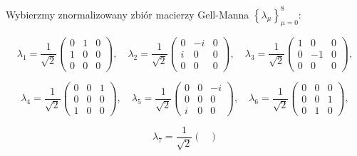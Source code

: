 {Wybierzmy znormalizowany zbiór macierzy Gell-Manna
$\left \{ \lambda_{\mu} \right \}_{\mu=0}^{8}$:
\begin{linenomath*}
 \begin{equation}
\nonumber
    \lambda_{1} = \frac{1}{\sqrt{2}} \begin{pmatrix}
            0 & 1 & 0 \\
            1 & 0 & 0 \\
            0 & 0 & 0
        \end{pmatrix}, \quad
    \lambda_{2} = \frac{1}{\sqrt{2}} \begin{pmatrix}
            0 & -i & 0 \\
            i & 0 & 0 \\
            0 & 0 & 0
        \end{pmatrix}, \quad
    \lambda_{3} = \frac{1}{\sqrt{2}} \begin{pmatrix}
            1 & 0 & 0 \\
            0 & -1 & 0 \\
            0 & 0 & 0
        \end{pmatrix},
 \end{equation}
\end{linenomath*}
\begin{linenomath*}
 \begin{equation}
\nonumber
    \lambda_{4} = \frac{1}{\sqrt{2}} \begin{pmatrix}
            0 & 0 & 1 \\
            0 & 0 & 0 \\
            1 & 0 & 0
        \end{pmatrix}, \quad
    \lambda_{5} = \frac{1}{\sqrt{2}} \begin{pmatrix}
            0 & 0 & -i \\
            0 & 0 & 0 \\
            i & 0 & 0
        \end{pmatrix}, \quad
    \lambda_{6} = \frac{1}{\sqrt{2}} \begin{pmatrix}
            0 & 0 & 0 \\
            0 & 0 & 1 \\
            0 & 1 & 0
        \end{pmatrix},
 \end{equation}
\end{linenomath*}
\begin{linenomath*}
 \begin{equation}
    \lambda_{7} = \frac{1}{\sqrt{2}} \begin{pmatrix}

\end{pmatrix}
\end{equation}
\end{linenomath*}}

